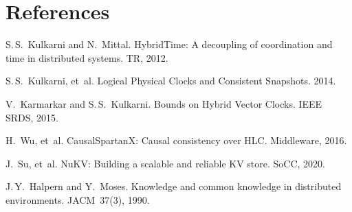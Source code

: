 \section*{References}

\begin{enumerate}[label={[}\arabic*{]}]
\item S.\,S.\ Kulkarni and N.\ Mittal.  HybridTime: A decoupling of
      coordination and time in distributed systems.  TR, 2012.
\item S.\,S.\ Kulkarni, et al.  Logical Physical Clocks and Consistent
      Snapshots.  2014.
\item V.\ Karmarkar and S.\,S.\ Kulkarni.  Bounds on Hybrid Vector
      Clocks.  IEEE SRDS, 2015.
\item H.\ Wu, et al.  CausalSpartanX: Causal consistency over HLC.
      Middleware, 2016.
\item J.\ Su, et al.  NuKV: Building a scalable and reliable KV store.
      SoCC, 2020.
\item J.\,Y.\ Halpern and Y.\ Moses.  Knowledge and common knowledge in
      distributed environments.  JACM 37(3), 1990.
\end{enumerate}
